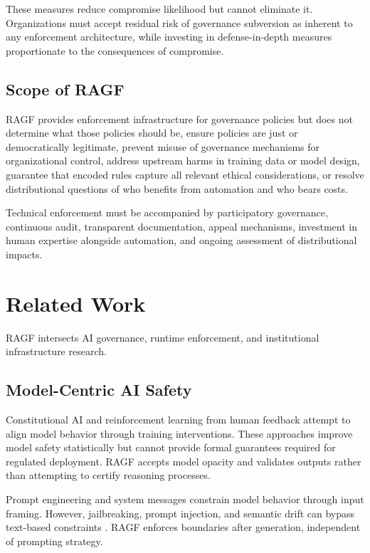 \documentclass[sigconf,nonacm]{acmart}
\begin{document}
These measures reduce compromise likelihood but cannot eliminate it. Organizations must accept residual risk of governance subversion as inherent to any enforcement architecture, while investing in defense-in-depth measures proportionate to the consequences of compromise.

\subsection{Scope of RAGF}

RAGF provides enforcement infrastructure for governance policies but does not determine what those policies should be, ensure policies are just or democratically legitimate, prevent misuse of governance mechanisms for organizational control, address upstream harms in training data or model design, guarantee that encoded rules capture all relevant ethical considerations, or resolve distributional questions of who benefits from automation and who bears costs.

Technical enforcement must be accompanied by participatory governance, continuous audit, transparent documentation, appeal mechanisms, investment in human expertise alongside automation, and ongoing assessment of distributional impacts.

\section{Related Work}

RAGF intersects AI governance, runtime enforcement, and institutional infrastructure research.

\subsection{Model-Centric AI Safety}

Constitutional AI \cite{bai2022constitutional} and reinforcement learning from human feedback \cite{ouyang2022training} attempt to align model behavior through training interventions. These approaches improve model safety statistically but cannot provide formal guarantees required for regulated deployment. RAGF accepts model opacity and validates outputs rather than attempting to certify reasoning processes.

Prompt engineering and system messages constrain model behavior through input framing. However, jailbreaking, prompt injection, and semantic drift can bypass text-based constraints \cite{perez2022red}. RAGF enforces boundaries after generation, independent of prompting strategy.
\end{document}
